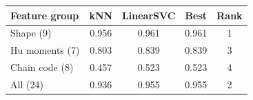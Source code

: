 \begin{tabular*}{\columnwidth}{@{\extracolsep{\fill}}lcccc@{}}
\toprule
Feature group & kNN & LinearSVC & Best & Rank \\
\midrule
Shape (9) & 0.956 & 0.961 & 0.961 & 1 \\
Hu moments (7) & 0.803 & 0.839 & 0.839 & 3 \\
Chain code (8) & 0.457 & 0.523 & 0.523 & 4 \\
All (24) & 0.936 & 0.955 & 0.955 & 2 \\
\bottomrule
\end{tabular*}
